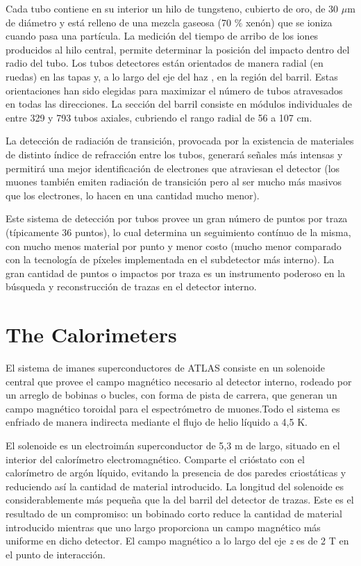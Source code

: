   Cada tubo contiene en su interior un hilo de tungsteno, cubierto de oro, de 30 $\mu$m de di\'ametro y est\'a relleno de una mezcla gaseosa (70 $\%$ xen\'on) que se ioniza cuando pasa una part\'icula. La medici\'on del tiempo de arribo de los iones producidos al hilo central, permite determinar la posici\'on del impacto dentro del radio del tubo. %
  Los tubos detectores est\'an orientados de manera radial (en ruedas) en las tapas y, a lo largo del eje del haz , en la regi\'on del barril. Estas orientaciones han sido elegidas para maximizar el n\'umero de tubos atravesados en todas las direcciones.  La secci\'on del barril consiste en m\'odulos individuales de entre 329 y 793 tubos axiales, cubriendo el rango radial de 56 a 107 cm.  

   La detecci\'on de radiaci\'on de transici\'on, provocada por la existencia de materiales de distinto \'indice de refracci\'on entre los tubos, generar\'a se\~nales m\'as intensas y permitir\'a una mejor identificaci\'on de electrones que atraviesan el detector (los muones tambi\'en emiten radiaci\'on de transici\'on pero al ser mucho m\'as masivos que los electrones, lo hacen en una cantidad mucho menor).

   Este sistema de detecci\'on por tubos provee un gran n\'umero de puntos por traza (t\'ipicamente 36 puntos), lo cual determina un seguimiento cont\'inuo de la misma, con mucho menos material por punto y menor costo (mucho menor comparado con la tecnolog\'ia de p\'ixeles implementada en el subdetector m\'as interno).  La gran cantidad de puntos o impactos por traza es un instrumento poderoso en la b\'usqueda y reconstrucci\'on de trazas en el detector interno.

\section{The Calorimeters}\label{sec:atlasCALO}
 El sistema de imanes superconductores de ATLAS consiste en un solenoide central que provee el campo magn\'etico necesario al detector interno, rodeado por un arreglo de bobinas o bucles, con forma de pista de carrera, que generan un campo magn\'etico toroidal para el espectr\'ometro de muones.Todo el sistema es enfriado de manera indirecta mediante el flujo de helio l\'iquido a 4,5 K.

   El solenoide es un electroim\'an superconductor de 5,3 m de largo, situado en el interior del calor\'imetro electromagn\'etico. Comparte el cri\'ostato con el calor\'imetro de arg\'on l\'iquido, evitando la presencia de dos paredes criost\'aticas y reduciendo as\'i la cantidad de material introducido. La longitud del solenoide es considerablemente m\'as peque\~na que la del barril del detector de trazas. Este es el resultado de un compromiso: un bobinado corto reduce la cantidad de material introducido mientras que uno largo proporciona un campo magn\'etico m\'as uniforme en dicho detector. El campo magn\'etico a lo largo del eje \emph{z} es de 2 T en el punto de interacci\'on.

